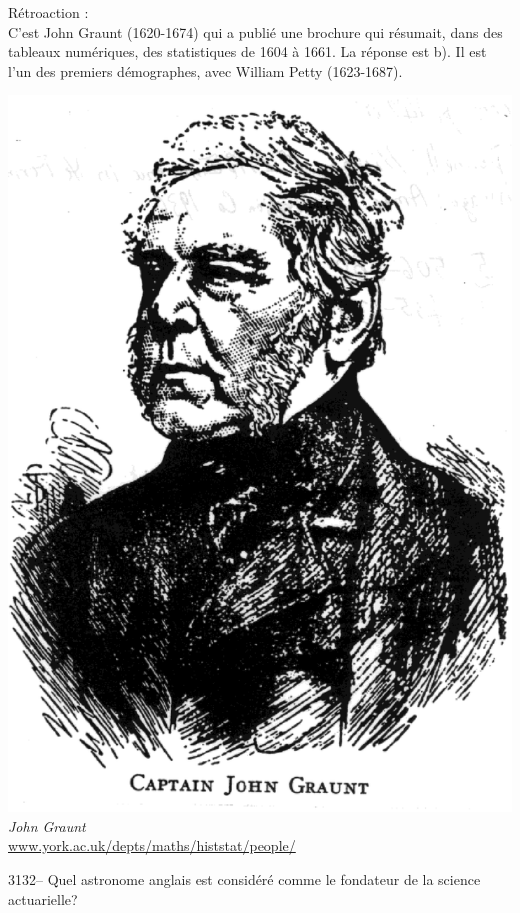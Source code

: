 \documentclass[letterpaper, 12pt]{article}
\begin{document}
R\'etroaction :\\
C'est John Graunt (1620-1674) qui a publi\'e une brochure qui r\'esumait, dans des tableaux num\'eriques, des statistiques de 1604 \`a 1661. La r\'eponse est b). Il est l'un des premiers d\'emographes, avec William Petty (1623-1687).
\begin{center}
\includegraphics[scale=0.13]{graunt.eps}\\
\emph{{\small John Graunt}}\\
\href{http://www.york.ac.uk/depts/maths/histstat/people/}{www.york.ac.uk/depts/maths/histstat/people/}\\[5mm]
\end{center}



3132-- Quel astronome anglais est consid\'er\'e comme le fondateur de la science actuarielle?\\
\end{document}
